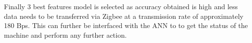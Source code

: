 Finally 3 best features model is selected as accuracy obtained is high and less data needs to be transferred via Zigbee at a transmission rate of approximately 180 Bps. This can further be interfaced with the ANN to to get the status of the machine and perform any further action.
